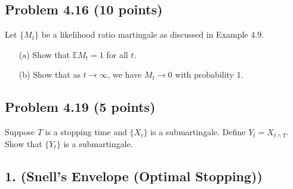 \documentclass{article}
\begin{document}


\subsection*{Problem 4.16 (10 points)}
Let $\{M_t\}$ be a likelihood ratio martingale as discussed in Example 4.9.

%

\begin{enumerate}
    \item[(a)] Show that $\mathbb{E}M_t = 1$ for all $t$.
    \item[(b)] Show that as $t \to \infty$, we have $M_t \to 0$ with probability 1.
\end{enumerate}


\subsection*{Problem 4.19 (5 points)}
Suppose $T$ is a stopping time and $\{X_t\}$ is a submartingale. Define $Y_t = X_{t \wedge T}$. Show that $\{Y_t\}$ is a submartingale.



\subsection*{1. (Snell’s Envelope (Optimal Stopping))}
\end{document}
